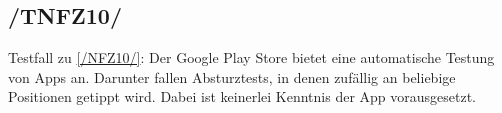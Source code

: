 \subsection*{/TNFZ10/}

\label{/TNFZ10/} Testfall zu \ref{/NFZ10/}: Der \Gls{Google Play Store} bietet eine automatische Testung von Apps an.
Darunter fallen Absturztests, in denen zufällig an beliebige Positionen getippt wird.
Dabei ist keinerlei Kenntnis der App vorausgesetzt.